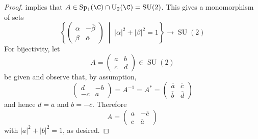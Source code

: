 \documentclass[10pt]{amsart}
\begin{document}
\begin{ex}
\begin{proof}
    implies that $A \in \operatorname{Sp}_1(\C) \cap \operatorname{U}_2(\C) = \operatorname{SU}(2)$.
    This gives a monomorphism of sets
    $$\left\{\left(\begin{matrix}
    \alpha & -\overline{\beta}\\
    \beta & \overline{\alpha}
  \end{matrix}\right) \;\middle\vert\; |\alpha|^2 + |\beta|^2 = 1\right\} \rightarrow \operatorname{SU}(2)$$
    For bijectivity, let
    $$A = \left(\begin{matrix}
      a & b\\
      c & d
    \end{matrix}\right) \in \operatorname{SU}(2)$$
    be given and observe that, by assumption,
    $$\left(\begin{matrix}
      d & -b\\
      -c & a
      \end{matrix}\right) = 
    A^{-1} = 
    A^* =
    \left(\begin{matrix}
      \overline{a} & \overline{c}\\
      \overline{b} & \overline{d}
      \end{matrix}\right)$$
    and hence $d = \overline{a}$ and $b = -\overline{c}$.
    Therefore 
    $$A = \left(\begin{matrix}
      a & -\overline{c}\\
      c & \overline{a}
    \end{matrix}\right)$$
    with $|a|^2 + |b|^2 = 1$, as desired.
  \end{proof}
\end{ex}
\end{document}
